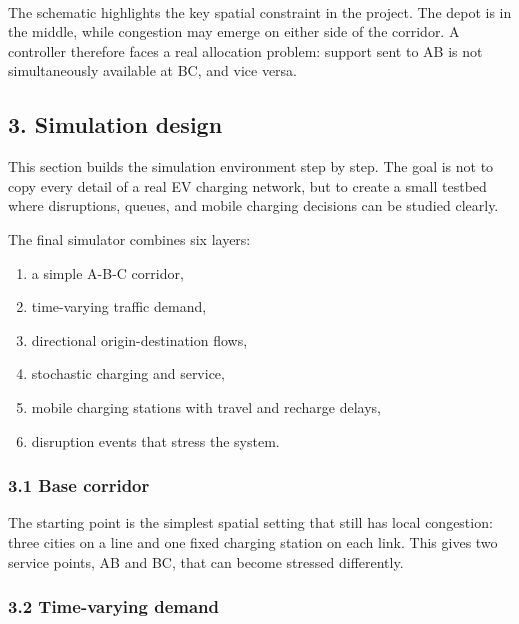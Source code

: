 \documentclass[11pt]{article}
\providecommand{\tightlist}{%
      \setlength{\itemsep}{0pt}\setlength{\parskip}{0pt}}
\begin{document}
    
    \begin{center}
    \end{center}
    { \hspace*{\fill} \\}
    
    The schematic highlights the key spatial constraint in the project. The
depot is in the middle, while congestion may emerge on either side of
the corridor. A controller therefore faces a real allocation problem:
support sent to AB is not simultaneously available at BC, and vice
versa.

    \subsection{3. Simulation design}\label{simulation-design}

This section builds the simulation environment step by step. The goal is
not to copy every detail of a real EV charging network, but to create a
small testbed where disruptions, queues, and mobile charging decisions
can be studied clearly.

The final simulator combines six layers:

\begin{enumerate}
\def\labelenumi{\arabic{enumi}.}
\tightlist
\item
  a simple A-B-C corridor,
\item
  time-varying traffic demand,
\item
  directional origin-destination flows,
\item
  stochastic charging and service,
\item
  mobile charging stations with travel and recharge delays,
\item
  disruption events that stress the system.
\end{enumerate}

    \subsubsection{3.1 Base corridor}\label{base-corridor}

The starting point is the simplest spatial setting that still has local
congestion: three cities on a line and one fixed charging station on
each link. This gives two service points, AB and BC, that can become
stressed differently.

    \subsubsection{3.2 Time-varying demand}\label{time-varying-demand}
\end{document}
